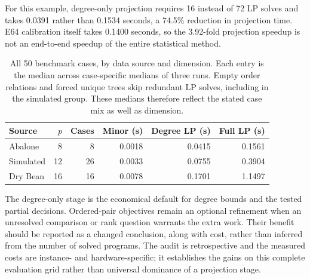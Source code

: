 For this example, degree-only projection requires 16 instead of 72 LP solves and takes 0.0391 rather than 0.1534 seconds, a 74.5\% reduction in projection time. E64 calibration itself takes 0.1400 seconds, so the 3.92-fold projection speedup is not an end-to-end speedup of the entire statistical method.


\begin{table}[H]\centering\small
\setlength{\tabcolsep}{4pt}
\caption{All 50 benchmark cases, by data source and dimension. Each entry is the median across case-specific medians of three runs. Empty order relations and forced unique trees skip redundant LP solves, including in the simulated group. These medians therefore reflect the stated case mix as well as dimension.}\label{tab:cost-grid}
\begin{lrbox}{\resultsbox}\begin{tabular}{lrrrrr}
\toprule
Source & $p$ & Cases & Minor (s) & Degree LP (s) & Full LP (s)\\
\midrule
Abalone & 8 & 8 & 0.0018 & 0.0415 & 0.1561\\
Simulated & 12 & 26 & 0.0033 & 0.0755 & 0.3904\\
Dry Bean & 16 & 16 & 0.0078 & 0.1701 & 1.1497\\
\bottomrule\end{tabular}\end{lrbox}\ifdim\wd\resultsbox>\linewidth\resizebox{\linewidth}{!}{\usebox{\resultsbox}}\else\usebox{\resultsbox}\fi\end{table}


The degree-only stage is the economical default for degree bounds and the tested partial decisions. Ordered-pair objectives remain an optional refinement when an unresolved comparison or rank question warrants the extra work. Their benefit should be reported as a changed conclusion, along with cost, rather than inferred from the number of solved programs. The audit is retrospective and the measured costs are instance- and hardware-specific; it establishes the gains on this complete evaluation grid rather than universal dominance of a projection stage.
